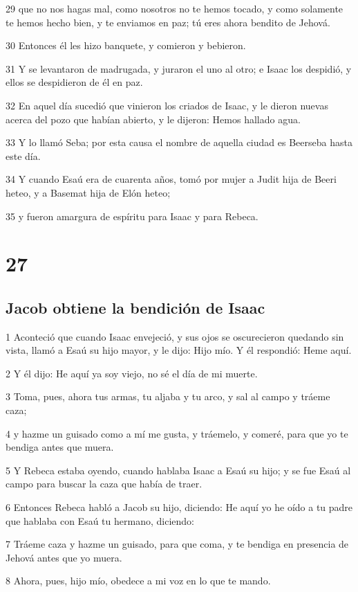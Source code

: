 29 que no nos hagas mal, como nosotros no te hemos tocado, y como solamente te hemos hecho bien, y te enviamos en paz; tú eres ahora bendito de Jehová.

30 Entonces él les hizo banquete, y comieron y bebieron.

31 Y se levantaron de madrugada, y juraron el uno al otro; e Isaac los despidió, y ellos se despidieron de él en paz.

32 En aquel día sucedió que vinieron los criados de Isaac, y le dieron nuevas acerca del pozo que habían abierto, y le dijeron: Hemos hallado agua.

33 Y lo llamó Seba; por esta causa el nombre de aquella ciudad es Beerseba hasta este día.

34 Y cuando Esaú era de cuarenta años, tomó por mujer a Judit hija de Beeri heteo, y a Basemat hija de Elón heteo;

35 y fueron amargura de espíritu para Isaac y para Rebeca.

\chapter{27}

\section{Jacob obtiene la bendición de Isaac}

1 Aconteció que cuando Isaac envejeció, y sus ojos se oscurecieron quedando sin vista, llamó a Esaú su hijo mayor, y le dijo: Hijo mío. Y él respondió: Heme aquí.

2 Y él dijo: He aquí ya soy viejo, no sé el día de mi muerte.

3 Toma, pues, ahora tus armas, tu aljaba y tu arco, y sal al campo y tráeme caza;

4 y hazme un guisado como a mí me gusta, y tráemelo, y comeré, para que yo te bendiga antes que muera.

5 Y Rebeca estaba oyendo, cuando hablaba Isaac a Esaú su hijo; y se fue Esaú al campo para buscar la caza que había de traer.

6 Entonces Rebeca habló a Jacob su hijo, diciendo: He aquí yo he oído a tu padre que hablaba con Esaú tu hermano, diciendo:

7 Tráeme caza y hazme un guisado, para que coma, y te bendiga en presencia de Jehová antes que yo muera.

8 Ahora, pues, hijo mío, obedece a mi voz en lo que te mando.


